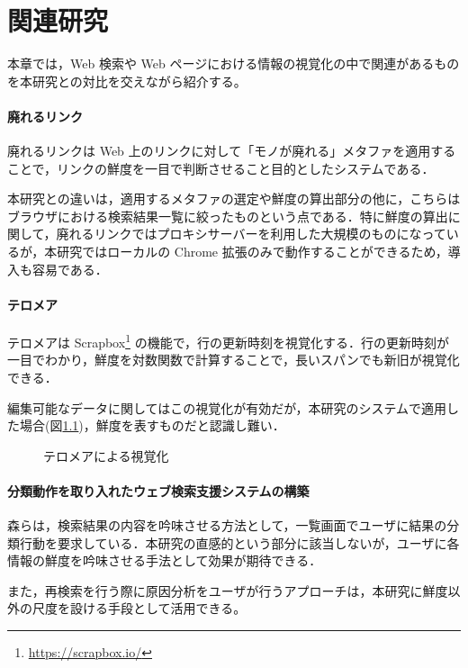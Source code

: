 \chapter{関連研究}
\label{chap:survey}

本章では，Web 検索や Web ページにおける情報の視覚化の中で関連があるものを本研究との対比を交えながら紹介する。

\newpage

\subsubsection{廃れるリンク}

廃れるリンク\cite{dyinglink}は Web 上のリンクに対して「モノが廃れる」メタファを適用することで，リンクの鮮度を一目で判断させること目的としたシステムである．

本研究との違いは，適用するメタファの選定や鮮度の算出部分の他に，こちらはブラウザにおける検索結果一覧に絞ったものという点である．特に鮮度の算出に関して，廃れるリンクではプロキシサーバーを利用した大規模のものになっているが，本研究ではローカルの Chrome 拡張のみで動作することができるため，導入も容易である．

\subsubsection{テロメア}

テロメア\cite{telomere}は Scrapbox\footnote{\url{https://scrapbox.io/}} の機能で，行の更新時刻を視覚化する．行の更新時刻が一目でわかり，鮮度を対数関数で計算することで，長いスパンでも新旧が視覚化できる．

編集可能なデータに関してはこの視覚化が有効だが，本研究のシステムで適用した場合(図\ref{fig:ver-telomere})，鮮度を表すものだと認識し難い．

\begin{figure}[htbp]
  \begin{center}
  \end{center}
  \caption{テロメアによる視覚化}
  \label{fig:ver-telomere}
\end{figure}

\subsubsection{分類動作を取り入れたウェブ検索支援システムの構築}

森\cite{classify}らは，検索結果の内容を吟味させる方法として，一覧画面でユーザに結果の分類行動を要求している．本研究の直感的という部分に該当しないが，ユーザに各情報の鮮度を吟味させる手法として効果が期待できる．

また，再検索を行う際に原因分析をユーザが行うアプローチは，本研究に鮮度以外の尺度を設ける手段として活用できる。
